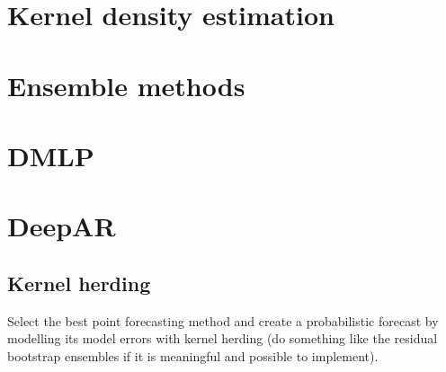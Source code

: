 \section{Kernel density estimation}


\section{Ensemble methods}


\section{DMLP}
\section{DeepAR}


\subsection{Kernel herding}
Select the best point forecasting method and create a probabilistic forecast by modelling its model errors with kernel herding (do something like the residual bootstrap ensembles if it is meaningful and possible to implement).
